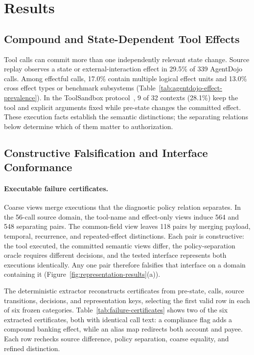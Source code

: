 \section{Results}

\subsection{Compound and State-Dependent Tool Effects}



Tool calls can commit more than one independently relevant state change. Source
replay observes a state or external-interaction effect in 29.5\% of 339
AgentDojo calls. Among effectful calls, 17.0\% contain multiple logical effect
units and 13.0\% cross effect types or benchmark subsystems
(Table~\ref{tab:agentdojo-effect-prevalence}). In the ToolSandbox
protocol~\cite{lu-etal-2025-toolsandbox}, 9 of 32 contexts (28.1\%) keep the
tool and explicit arguments fixed while
pre-state changes the committed effect. These execution facts establish the
semantic distinctions; the separating relations below determine which of them
matter to authorization.

\subsection{Constructive Falsification and Interface Conformance}



\paragraph{Executable failure certificates.}
Coarse views merge executions that the diagnostic policy relation separates.
In the 56-call source domain, the tool-name and effect-only views induce 564 and
548 separating pairs. The common-field view leaves 118 pairs by merging
payload, temporal, recurrence, and repeated-effect distinctions. Each pair is
constructive: the tool executed, the committed semantic views differ, the
policy-separation oracle requires different decisions, and the tested interface
represents both executions identically. Any one pair therefore falsifies that
interface on a domain containing it (Figure~\ref{fig:representation-results}(a)).


The deterministic extractor reconstructs certificates from pre-state, calls,
source transitions, decisions, and representation keys, selecting the first
valid row in each of six frozen categories. Table~\ref{tab:failure-certificates}
shows two of the six extracted certificates, both with identical call text: a compliance flag adds a compound
banking effect, while an alias map redirects both account and payee. Each row
rechecks source difference, policy separation, coarse equality, and refined
distinction.

